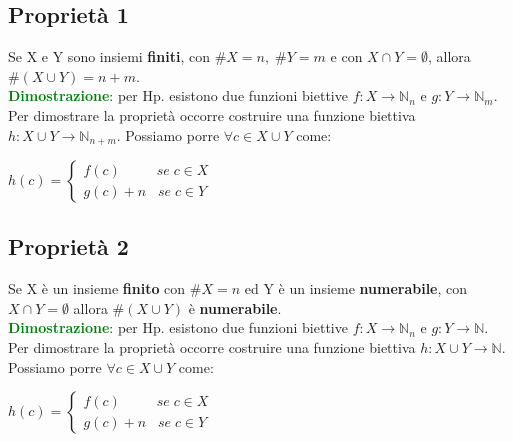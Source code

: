 \newpage
\subsection{Proprietà 1}
Se X e Y sono insiemi \textbf{finiti}, con $\#X = n, \; \#Y = m$ e con $X \cap Y = \emptyset$, allora $\#(X \cup Y) = n + m$. \\
\textcolor{green}{\textbf{Dimostrazione}}: per Hp. esistono due funzioni biettive $f : X \rightarrow \mathbb{N}_n$ e $g : Y \rightarrow \mathbb{N}_m$. Per dimostrare la proprietà occorre costruire una funzione biettiva $h : X \cup Y \rightarrow \mathbb{N}_{n + m}$. Possiamo porre $\forall c \in X \cup Y$ come:
\begin{center}
    \begin{math}
        h(c) = 
        \begin{cases}
            f(c) \qquad \;\; se \; c \in X \\
            g(c) + n \; \;\; se \; c \in Y
        \end{cases}
    \end{math}
\end{center}

\subsection{Proprietà 2}
Se X è un insieme \textbf{finito} con $\#X = n$ ed Y è un insieme \textbf{numerabile}, con $X \cap Y = \emptyset$ allora $\#(X \cup Y)$ è \textbf{numerabile}. \\
\textcolor{green}{\textbf{Dimostrazione}}: per Hp. esistono due funzioni biettive $f : X \rightarrow \mathbb{N}_n$ e $g : Y \rightarrow \mathbb{N}$. Per dimostrare la proprietà occorre costruire una funzione biettiva $h : X \cup Y \rightarrow \mathbb{N}$. Possiamo porre $\forall c \in X \cup Y$ come:
\begin{center}
    \begin{math}
        h(c) = 
        \begin{cases}
            f(c) \qquad \;\; se \; c \in X \\
            g(c) + n \; \;\; se \; c \in Y
        \end{cases}
    \end{math}
\end{center}

